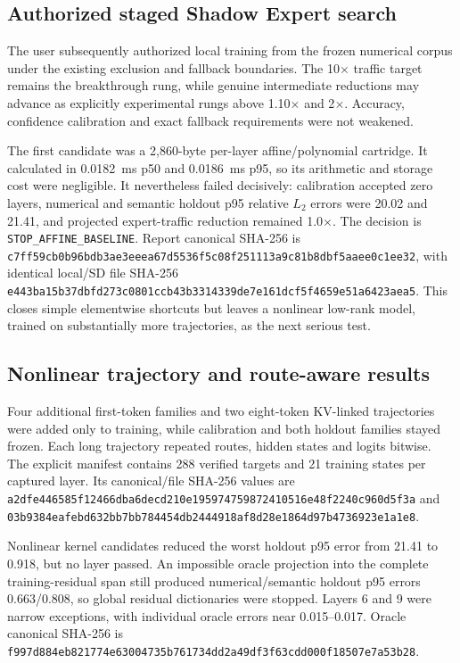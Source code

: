 \subsection{Authorized staged Shadow Expert search}

The user subsequently authorized local training from the frozen numerical
corpus under the existing exclusion and fallback boundaries.  The 10$\times$
traffic target remains the breakthrough rung, while genuine intermediate
reductions may advance as explicitly experimental rungs above 1.10$\times$ and
2$\times$.  Accuracy, confidence calibration and exact fallback requirements
were not weakened.

The first candidate was a 2,860-byte per-layer affine/polynomial cartridge.  It
calculated in 0.0182~ms p50 and 0.0186~ms p95, so its arithmetic and storage
cost were negligible.  It nevertheless failed decisively: calibration accepted
zero layers, numerical and semantic holdout p95 relative $L_2$ errors were
20.02 and 21.41, and projected expert-traffic reduction remained 1.0$\times$.
The decision is \texttt{STOP\_AFFINE\_BASELINE}.  Report canonical SHA-256 is
\texttt{c7ff59cb0b96bdb3ae3eeea67d5536f5c08f251113a9c81b8dbf5aaee0c1ee32},
with identical local/SD file SHA-256
\texttt{e443ba15b37dbfd273c0801ccb43b3314339de7e161dcf5f4659e51a6423aea5}.
This closes simple elementwise shortcuts but leaves a nonlinear low-rank model,
trained on substantially more trajectories, as the next serious test.

\subsection{Nonlinear trajectory and route-aware results}

Four additional first-token families and two eight-token KV-linked trajectories
were added only to training, while calibration and both holdout families stayed
frozen.  Each long trajectory repeated routes, hidden states and logits bitwise.
The explicit manifest contains 288 verified targets and 21 training states per
captured layer.  Its canonical/file SHA-256 values are
\texttt{a2dfe446585f12466dba6decd210e195974759872410516e48f2240c960d5f3a}
and
\texttt{03b9384eafebd632bb7bb784454db2444918af8d28e1864d97b4736923e1a1e8}.

Nonlinear kernel candidates reduced the worst holdout p95 error from 21.41 to
0.918, but no layer passed.  An impossible oracle projection into the complete
training-residual span still produced numerical/semantic holdout p95 errors
0.663/0.808, so global residual dictionaries were stopped.  Layers 6 and 9
were narrow exceptions, with individual oracle errors near 0.015--0.017.
Oracle canonical SHA-256 is
\texttt{f997d884eb821774e63004735b761734dd2a49df3f63cdd000f18507e7a53b28}.

